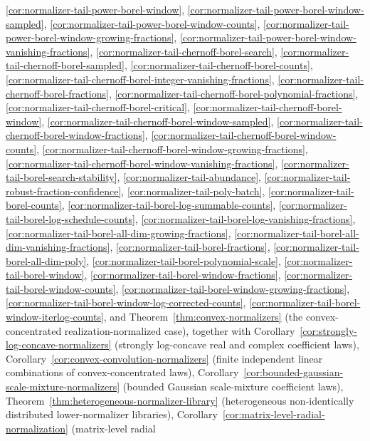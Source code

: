 \documentclass[11pt]{amsart}
\numberwithin{equation}{section}
\theoremstyle{definition}
\theoremstyle{remark}
\begin{document}
\ref{cor:normalizer-tail-power-borel-window},
\ref{cor:normalizer-tail-power-borel-window-sampled},
\ref{cor:normalizer-tail-power-borel-window-counts},
\ref{cor:normalizer-tail-power-borel-window-growing-fractions},
\ref{cor:normalizer-tail-power-borel-window-vanishing-fractions},
\ref{cor:normalizer-tail-chernoff-borel-search},
\ref{cor:normalizer-tail-chernoff-borel-sampled},
\ref{cor:normalizer-tail-chernoff-borel-counts},
\ref{cor:normalizer-tail-chernoff-borel-integer-vanishing-fractions},
\ref{cor:normalizer-tail-chernoff-borel-fractions},
\ref{cor:normalizer-tail-chernoff-borel-polynomial-fractions},
\ref{cor:normalizer-tail-chernoff-borel-critical},
\ref{cor:normalizer-tail-chernoff-borel-window},
\ref{cor:normalizer-tail-chernoff-borel-window-sampled},
\ref{cor:normalizer-tail-chernoff-borel-window-fractions},
\ref{cor:normalizer-tail-chernoff-borel-window-counts},
\ref{cor:normalizer-tail-chernoff-borel-window-growing-fractions},
\ref{cor:normalizer-tail-chernoff-borel-window-vanishing-fractions},
\ref{cor:normalizer-tail-borel-search-stability},
\ref{cor:normalizer-tail-abundance},
\ref{cor:normalizer-tail-robust-fraction-confidence},
\ref{cor:normalizer-tail-poly-batch},
\ref{cor:normalizer-tail-borel-counts},
\ref{cor:normalizer-tail-borel-log-summable-counts},
\ref{cor:normalizer-tail-borel-log-schedule-counts},
\ref{cor:normalizer-tail-borel-log-vanishing-fractions},
\ref{cor:normalizer-tail-borel-all-dim-growing-fractions},
\ref{cor:normalizer-tail-borel-all-dim-vanishing-fractions},
\ref{cor:normalizer-tail-borel-fractions},
\ref{cor:normalizer-tail-borel-all-dim-poly},
\ref{cor:normalizer-tail-borel-polynomial-scale},
\ref{cor:normalizer-tail-borel-window},
\ref{cor:normalizer-tail-borel-window-fractions},
\ref{cor:normalizer-tail-borel-window-counts},
\ref{cor:normalizer-tail-borel-window-growing-fractions},
\ref{cor:normalizer-tail-borel-window-log-corrected-counts},
\ref{cor:normalizer-tail-borel-window-iterlog-counts}, and
Theorem~\ref{thm:convex-normalizers} (the convex-concentrated realization-normalized
case), together with
Corollary~\ref{cor:strongly-log-concave-normalizers} (strongly log-concave
real and complex coefficient laws),
Corollary~\ref{cor:convex-convolution-normalizers} (finite independent linear
combinations of convex-concentrated laws),
Corollary~\ref{cor:bounded-gaussian-scale-mixture-normalizers} (bounded Gaussian
scale-mixture coefficient laws),
Theorem~\ref{thm:heterogeneous-normalizer-library} (heterogeneous
non-identically distributed lower-normalizer libraries),
Corollary~\ref{cor:matrix-level-radial-normalization} (matrix-level radial
\end{document}
